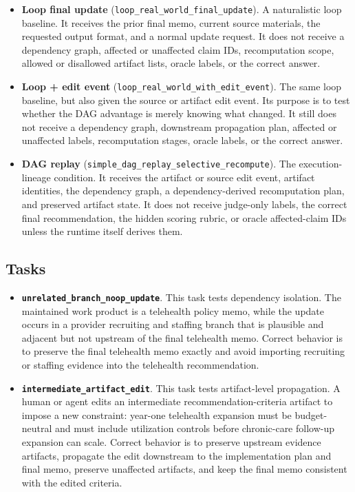 \documentclass{article}
\begin{document}
\begin{itemize}
\item \textbf{Loop final update} (\texttt{loop\_real\_world\_final\_update}). A naturalistic loop baseline. It receives the prior final memo, current source materials, the requested output format, and a normal update request. It does not receive a dependency graph, affected or unaffected claim IDs, recomputation scope, allowed or disallowed artifact lists, oracle labels, or the correct answer.
\item \textbf{Loop + edit event} (\texttt{loop\_real\_world\_with\_edit\_event}). The same loop baseline, but also given the source or artifact edit event. Its purpose is to test whether the DAG advantage is merely knowing what changed. It still does not receive a dependency graph, downstream propagation plan, affected or unaffected labels, recomputation stages, oracle labels, or the correct answer.
\item \textbf{DAG replay} (\texttt{simple\_dag\_replay\_selective\_recompute}). The execution-lineage condition. It receives the artifact or source edit event, artifact identities, the dependency graph, a dependency-derived recomputation plan, and preserved artifact state. It does not receive judge-only labels, the correct final recommendation, the hidden scoring rubric, or oracle affected-claim IDs unless the runtime itself derives them.
\end{itemize}

\subsection{Tasks}

\begin{itemize}
\item \textbf{\texttt{unrelated\_branch\_noop\_update}}. This task tests dependency isolation. The maintained work product is a telehealth policy memo, while the update occurs in a provider recruiting and staffing branch that is plausible and adjacent but not upstream of the final telehealth memo. Correct behavior is to preserve the final telehealth memo exactly and avoid importing recruiting or staffing evidence into the telehealth recommendation.
\item \textbf{\texttt{intermediate\_artifact\_edit}}. This task tests artifact-level propagation. A human or agent edits an intermediate recommendation-criteria artifact to impose a new constraint: year-one telehealth expansion must be budget-neutral and must include utilization controls before chronic-care follow-up expansion can scale. Correct behavior is to preserve upstream evidence artifacts, propagate the edit downstream to the implementation plan and final memo, preserve unaffected artifacts, and keep the final memo consistent with the edited criteria.
\end{itemize}
\end{document}
